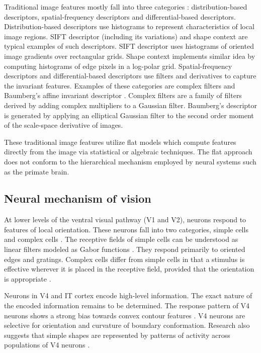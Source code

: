 \documentclass[10pt]{article}
\begin{document}
Traditional image features mostly fall into three categories \cite{mikolajczyk2005}: 
distribution-based descriptors, spatial-frequency descriptors and differential-based descriptors.
Distribution-based descriptors use histograms 
to represent characteristics of local image regions.
SIFT descriptor \cite{lowe1999} (including its variations) 
and shape context \cite{belongie2002} are typical examples of such descriptors.
SIFT descriptor uses histograms 
of oriented image gradients over rectangular grids.
Shape context implements similar idea 
by computing histograms of edge pixels in a log-polar grid.
Spatial-frequency descriptors and differential-based descriptors 
use filters and derivatives to capture the invariant features. 
Examples of these categories are 
complex filters \cite{schaffalitzky2002} 
and Baumberg's affine invariant descriptor \cite{baumberg2000}.
Complex filters are a family of filters 
derived by adding complex multipliers to a Gaussian filter.
Baumberg's descriptor is generated 
by applying an elliptical Gaussian filter 
to the second order moment 
of the scale-space derivative \cite{lindeberg1993} of images.

These traditional image features utilize flat models which compute features directly from the image
via statistical or algebraic techniques. 
The flat approach does not conform to the hierarchical mechanism \cite{ungerleider2011} 
employed by neural systems such as the primate brain.

\subsection{Neural mechanism of vision}

At lower levels of the ventral visual pathway (V1 and V2), neurons respond to features of local orientation. 
These neurons fall into two categories, 
simple cells and complex cells \cite{hubel1962,hubel1965,martinez2003}.
The receptive fields of simple cells 
can be understood as linear filters modeled as Gabor functions \cite{gabor1946}. 
They respond primarily to oriented edges and gratings.
Complex cells differ from simple cells in that a stimulus is
effective wherever it is placed in the receptive field, provided
that the orientation is appropriate \cite{hubel1962,hubel1965}. 

Neurons in V4 and IT cortex encode high-level information.
The exact nature of the encoded information remains to be determined.
The response pattern of V4 neurons shows 
a strong bias towards convex contour features \cite{pasupathy1999,pasupathy2001,pasupathy2002}. 
V4 neurons are selective for orientation and curvature of boundary conformation.
Research also suggests that simple shapes are represented 
by patterns of activity across populations of V4 neurons \cite{pasupathy2002}.
\end{document}
